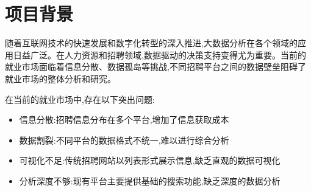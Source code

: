 \section{项目背景}

随着互联网技术的快速发展和数字化转型的深入推进,大数据分析在各个领域的应用日益广泛。在人力资源和招聘领域,数据驱动的决策支持变得尤为重要。当前的就业市场面临着信息分散、数据孤岛等挑战,不同招聘平台之间的数据壁垒阻碍了就业市场的整体分析和研究。

在当前的就业市场中,存在以下突出问题:

\begin{itemize}
    \item 信息分散:招聘信息分布在多个平台,增加了信息获取成本
    \item 数据割裂:不同平台的数据格式不统一,难以进行综合分析
    \item 可视化不足:传统招聘网站以列表形式展示信息,缺乏直观的数据可视化
    \item 分析深度不够:现有平台主要提供基础的搜索功能,缺乏深度的数据分析
\end{itemize}